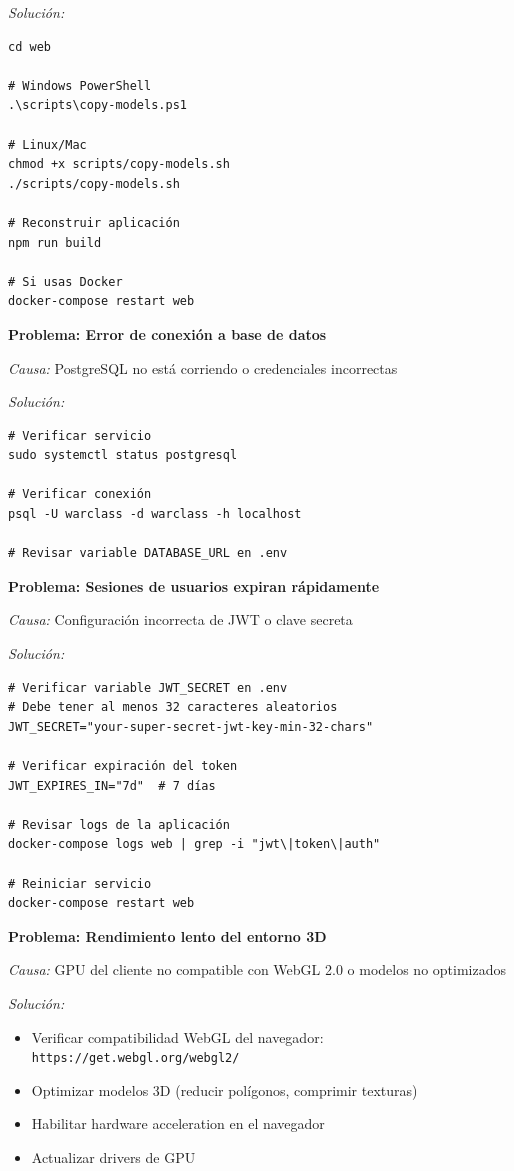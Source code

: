 \textit{Solución:}
\begin{verbatim}
cd web

# Windows PowerShell
.\scripts\copy-models.ps1

# Linux/Mac  
chmod +x scripts/copy-models.sh
./scripts/copy-models.sh

# Reconstruir aplicación
npm run build

# Si usas Docker
docker-compose restart web
\end{verbatim}

\textbf{Problema: Error de conexión a base de datos}

\textit{Causa:} PostgreSQL no está corriendo o credenciales incorrectas

\textit{Solución:}
\begin{verbatim}
# Verificar servicio
sudo systemctl status postgresql

# Verificar conexión
psql -U warclass -d warclass -h localhost

# Revisar variable DATABASE_URL en .env
\end{verbatim}

\textbf{Problema: Sesiones de usuarios expiran rápidamente}

\textit{Causa:} Configuración incorrecta de JWT o clave secreta

\textit{Solución:}
\begin{verbatim}
# Verificar variable JWT_SECRET en .env
# Debe tener al menos 32 caracteres aleatorios
JWT_SECRET="your-super-secret-jwt-key-min-32-chars"

# Verificar expiración del token
JWT_EXPIRES_IN="7d"  # 7 días

# Revisar logs de la aplicación
docker-compose logs web | grep -i "jwt\|token\|auth"

# Reiniciar servicio
docker-compose restart web
\end{verbatim}

\textbf{Problema: Rendimiento lento del entorno 3D}

\textit{Causa:} GPU del cliente no compatible con WebGL 2.0 o modelos no optimizados

\textit{Solución:}
\begin{itemize}
	\item Verificar compatibilidad WebGL del navegador: \texttt{https://get.webgl.org/webgl2/}
	\item Optimizar modelos 3D (reducir polígonos, comprimir texturas)
	\item Habilitar hardware acceleration en el navegador
	\item Actualizar drivers de GPU
\end{itemize}

